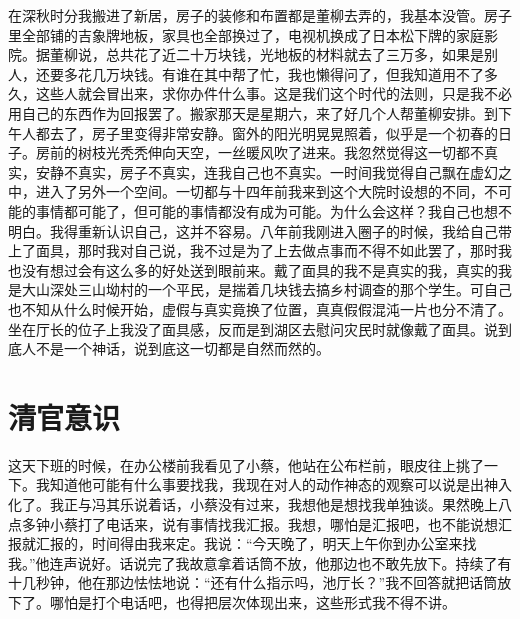 \documentclass[12pt,oneside]{book}
\begin{document}
在深秋时分我搬进了新居，房子的装修和布置都是董柳去弄的，我基本没管。房子里全部铺的吉象牌地板，家具也全部换过了，电视机换成了日本松下牌的家庭影院。据董柳说，总共花了近二十万块钱，光地板的材料就去了三万多，如果是别人，还要多花几万块钱。有谁在其中帮了忙，我也懒得问了，但我知道用不了多久，这些人就会冒出来，求你办件什么事。这是我们这个时代的法则，只是我不必用自己的东西作为回报罢了。搬家那天是星期六，来了好几个人帮董柳安排。到下午人都去了，房子里变得非常安静。窗外的阳光明晃晃照着，似乎是一个初春的日子。房前的树枝光秃秃伸向天空，一丝暖风吹了进来。我忽然觉得这一切都不真实，安静不真实，房子不真实，连我自己也不真实。一时间我觉得自己飘在虚幻之中，进入了另外一个空间。一切都与十四年前我来到这个大院时设想的不同，不可能的事情都可能了，但可能的事情都没有成为可能。为什么会这样？我自己也想不明白。我得重新认识自己，这并不容易。八年前我刚进入圈子的时候，我给自己带上了面具，那时我对自己说，我不过是为了上去做点事而不得不如此罢了，那时我也没有想过会有这么多的好处送到眼前来。戴了面具的我不是真实的我，真实的我是大山深处三山坳村的一个平民，是揣着几块钱去搞乡村调查的那个学生。可自己也不知从什么时候开始，虚假与真实竟换了位置，真真假假混沌一片也分不清了。坐在厅长的位子上我没了面具感，反而是到湖区去慰问灾民时就像戴了面具。说到底人不是一个神话，说到底这一切都是自然而然的。


\chapter{清官意识}
这天下班的时候，在办公楼前我看见了小蔡，他站在公布栏前，眼皮往上挑了一下。我知道他可能有什么事要找我，我现在对人的动作神态的观察可以说是出神入化了。我正与冯其乐说着话，小蔡没有过来，我想他是想找我单独谈。果然晚上八点多钟小蔡打了电话来，说有事情找我汇报。我想，哪怕是汇报吧，也不能说想汇报就汇报的，时间得由我来定。我说：``今天晚了，明天上午你到办公室来找我。''他连声说好。话说完了我故意拿着话筒不放，他那边也不敢先放下。持续了有十几秒钟，他在那边怯怯地说：``还有什么指示吗，池厅长？''我不回答就把话筒放下了。哪怕是打个电话吧，也得把层次体现出来，这些形式我不得不讲。
\end{document}
